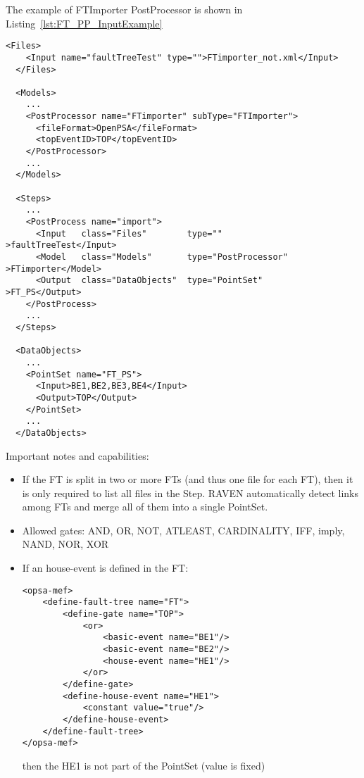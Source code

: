 The example of FTImporter PostProcessor is shown in Listing~\ref{lst:FT_PP_InputExample}
\begin{lstlisting}[style=XML,morekeywords={anAttribute},caption=FT Importer input example., label=lst:FT_PP_InputExample]
  <Files>
    <Input name="faultTreeTest" type="">FTimporter_not.xml</Input>
  </Files>

  <Models>
    ...
    <PostProcessor name="FTimporter" subType="FTImporter">
      <fileFormat>OpenPSA</fileFormat>
      <topEventID>TOP</topEventID>
    </PostProcessor>
    ...
  </Models>

  <Steps>
    ...
    <PostProcess name="import">
      <Input   class="Files"        type=""                >faultTreeTest</Input>
      <Model   class="Models"       type="PostProcessor"   >FTimporter</Model>
      <Output  class="DataObjects"  type="PointSet"        >FT_PS</Output>
    </PostProcess>
    ...
  </Steps>

  <DataObjects>
    ...
    <PointSet name="FT_PS">
      <Input>BE1,BE2,BE3,BE4</Input>
      <Output>TOP</Output>
    </PointSet>
    ...
  </DataObjects>
\end{lstlisting}

Important notes and capabilities:
\begin{itemize}
	\item If the FT is split in two or more FTs (and thus one file for each FT), then it is only required to list
	      all files in the Step. RAVEN automatically detect links among FTs and merge all of them into a single PointSet.
	\item Allowed gates: AND, OR, NOT, ATLEAST, CARDINALITY, IFF, imply, NAND, NOR, XOR
	\item If an house-event is defined in the FT:
\begin{lstlisting}[style=XML,morekeywords={anAttribute},caption=FT Importer input example: house-event., label=lst:FT_house event]
<opsa-mef>
    <define-fault-tree name="FT">
        <define-gate name="TOP">
            <or>
                <basic-event name="BE1"/>
                <basic-event name="BE2"/>
                <house-event name="HE1"/>
            </or>
        </define-gate>
        <define-house-event name="HE1">
        	<constant value="true"/>
        </define-house-event>
    </define-fault-tree>
</opsa-mef>
\end{lstlisting}
           then the HE1 is not part of the PointSet (value is fixed)
\end{itemize}

